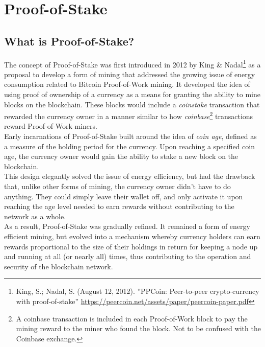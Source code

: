 \documentclass[11pt]{article}
\begin{document}
\bigskip

\section{Proof-of-Stake}

\subsection{What is Proof-of-Stake?}
The concept of Proof-of-Stake was first introduced in 2012 by King \& Nadal\footnote{King, S.; Nadal, S. (August 12, 2012). ”PPCoin: Peer-to-peer crypto-currency  with  proof-of-stake” \url{https://peercoin.net/assets/paper/peercoin-paper.pdf}} as a proposal to develop a form of mining that addressed the growing issue of energy consumption related to Bitcoin Proof-of-Work mining. It developed the idea of using proof of ownership of a currency as a means for granting the ability to mine blocks on the blockchain. These blocks would include a \textit{coinstake} transaction that rewarded the currency owner in a manner similar to how \textit{coinbase}\footnote{A coinbase transaction is included in each Proof-of-Work block to pay the mining reward to the miner who found the block. Not to be confused with the Coinbase exchange.} transactions reward Proof-of-Work miners.\\

\noindent Early incarnations of Proof-of-Stake built around the idea of \textit{coin age}, defined as a measure of the holding period for the currency. Upon reaching a specified coin age, the currency owner would gain the ability to stake a new block on the blockchain.\\

\noindent This design elegantly solved the issue of energy efficiency, but had the drawback that, unlike other forms of mining, the currency owner didn't have to do anything. They could simply leave their wallet off, and only activate it upon reaching the age level needed to earn rewards without contributing to the network as a whole.\\

\noindent As a result, Proof-of-Stake was gradually refined. It remained a form of energy efficient mining, but evolved into a mechanism whereby currency holders can earn rewards proportional to the size of their holdings in return for keeping a node up and running at all (or nearly all) times, thus contributing to the operation and security of the blockchain network.\\
\end{document}
